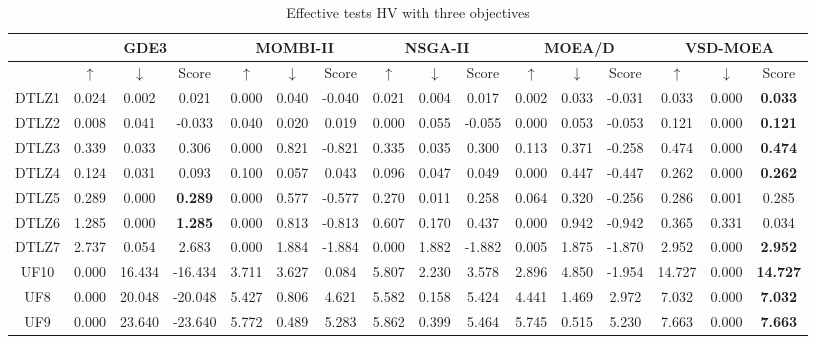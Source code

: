 \begin{table}[t]
\centering
\caption{Effective tests HV with three objectives}
\label{tab:Effective_Test_3obj}
\resizebox{\textwidth}{!}
{%
\begin{tabular}{c|c|c|c|c|c|c|c|c|c|c|c|c|c|c|c}
\hline
 & \multicolumn{3}{c|}{GDE3} & \multicolumn{3}{c|}{MOMBI-II} & \multicolumn{3}{c|}{NSGA-II} & \multicolumn{3}{c|}{MOEA/D} & \multicolumn{3}{c}{VSD-MOEA} \\ \hline
 & $\uparrow$ & $\downarrow$ & Score & $\uparrow$ & $\downarrow$ & Score & $\uparrow$ & $\downarrow$ & Score & $\uparrow$ & $\downarrow$ & Score & $\uparrow$ & $\downarrow$ & Score \\ \hline
DTLZ1 & 0.024 & 0.002 & 0.021 & 0.000 & 0.040 & -0.040 & 0.021 & 0.004 & 0.017 & 0.002 & 0.033 & -0.031 & 0.033 & 0.000 & \textbf{0.033} \\ \hline
DTLZ2 & 0.008 & 0.041 & -0.033 & 0.040 & 0.020 & 0.019 & 0.000 & 0.055 & -0.055 & 0.000 & 0.053 & -0.053 & 0.121 & 0.000 & \textbf{0.121} \\ \hline
DTLZ3 & 0.339 & 0.033 & 0.306 & 0.000 & 0.821 & -0.821 & 0.335 & 0.035 & 0.300 & 0.113 & 0.371 & -0.258 & 0.474 & 0.000 & \textbf{0.474} \\ \hline
DTLZ4 & 0.124 & 0.031 & 0.093 & 0.100 & 0.057 & 0.043 & 0.096 & 0.047 & 0.049 & 0.000 & 0.447 & -0.447 & 0.262 & 0.000 & \textbf{0.262} \\ \hline
DTLZ5 & 0.289 & 0.000 & \textbf{0.289} & 0.000 & 0.577 & -0.577 & 0.270 & 0.011 & 0.258 & 0.064 & 0.320 & -0.256 & 0.286 & 0.001 & 0.285 \\ \hline
DTLZ6 & 1.285 & 0.000 & \textbf{1.285} & 0.000 & 0.813 & -0.813 & 0.607 & 0.170 & 0.437 & 0.000 & 0.942 & -0.942 & 0.365 & 0.331 & 0.034 \\ \hline
DTLZ7 & 2.737 & 0.054 & 2.683 & 0.000 & 1.884 & -1.884 & 0.000 & 1.882 & -1.882 & 0.005 & 1.875 & -1.870 & 2.952 & 0.000 & \textbf{2.952} \\ \hline
UF10 & 0.000 & 16.434 & -16.434 & 3.711 & 3.627 & 0.084 & 5.807 & 2.230 & 3.578 & 2.896 & 4.850 & -1.954 & 14.727 & 0.000 & \textbf{14.727} \\ \hline
UF8 & 0.000 & 20.048 & -20.048 & 5.427 & 0.806 & 4.621 & 5.582 & 0.158 & 5.424 & 4.441 & 1.469 & 2.972 & 7.032 & 0.000 & \textbf{7.032} \\ \hline
UF9 & 0.000 & 23.640 & -23.640 & 5.772 & 0.489 & 5.283 & 5.862 & 0.399 & 5.464 & 5.745 & 0.515 & 5.230 & 7.663 & 0.000 & \textbf{7.663} \\ \hline

\end{tabular}}
\end{table}
